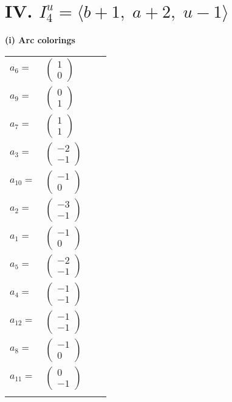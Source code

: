 \documentclass[1p]{elsarticle_modified}
\theoremstyle{definition}
\begin{document}
\centering \section*{IV. $I^u_{4}= \langle b+1,\;a+2,\;u-1 \rangle$}
\flushleft \textbf{(i) Arc colorings}\\
\begin{tabular}{m{7pt} m{180pt} m{7pt} m{180pt} }
\flushright $a_{6}=$&$\begin{pmatrix}1\\0\end{pmatrix}$ \\
\flushright $a_{9}=$&$\begin{pmatrix}0\\1\end{pmatrix}$ \\
\flushright $a_{7}=$&$\begin{pmatrix}1\\1\end{pmatrix}$ \\
\flushright $a_{3}=$&$\begin{pmatrix}-2\\-1\end{pmatrix}$ \\
\flushright $a_{10}=$&$\begin{pmatrix}-1\\0\end{pmatrix}$ \\
\flushright $a_{2}=$&$\begin{pmatrix}-3\\-1\end{pmatrix}$ \\
\flushright $a_{1}=$&$\begin{pmatrix}-1\\0\end{pmatrix}$ \\
\flushright $a_{5}=$&$\begin{pmatrix}-2\\-1\end{pmatrix}$ \\
\flushright $a_{4}=$&$\begin{pmatrix}-1\\-1\end{pmatrix}$ \\
\flushright $a_{12}=$&$\begin{pmatrix}-1\\-1\end{pmatrix}$ \\
\flushright $a_{8}=$&$\begin{pmatrix}-1\\0\end{pmatrix}$ \\
\flushright $a_{11}=$&$\begin{pmatrix}0\\-1\end{pmatrix}$\\&\end{tabular}
\end{document}
